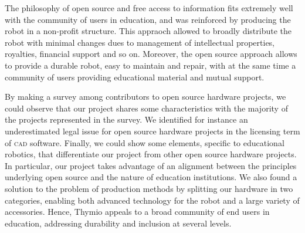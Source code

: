 \documentclass[letterpaper, 10 pt, conference]{ieeeconf}  %
\begin{document}
The philosophy of open source and free access to information fits extremely well with the community of users in education, and was reinforced by producing the robot in a non-profit structure.
This appraoch allowed to broadly distribute the robot with minimal changes dues to management of intellectual properties, royalties, financial support and so on.
Moreover, the open source approach allows to provide a durable robot, easy to maintain and repair, with at the same time a community of users providing educational material and mutual support.

By making a survey among contributors to open source hardware projects, we could observe that our project shares some characteristics with the majority of the projects represented in the survey. 
We identified for instance an underestimated legal issue for open source hardware projects in the licensing term of \textsc{cad} software.
Finally, we could show some elements, specific to educational robotics, that differentiate our project from other open source hardware projects.
In particular, our project takes advantage of an alignment between the principles underlying open source and the nature of education institutions. 
We also found a solution to the problem of production methods by splitting our hardware in two categories, enabling both advanced technology for the robot and a large variety of accessories.
Hence, Thymio appeals to a broad community of end users in education, addressing durability and inclusion at several levels.




\end{document}

